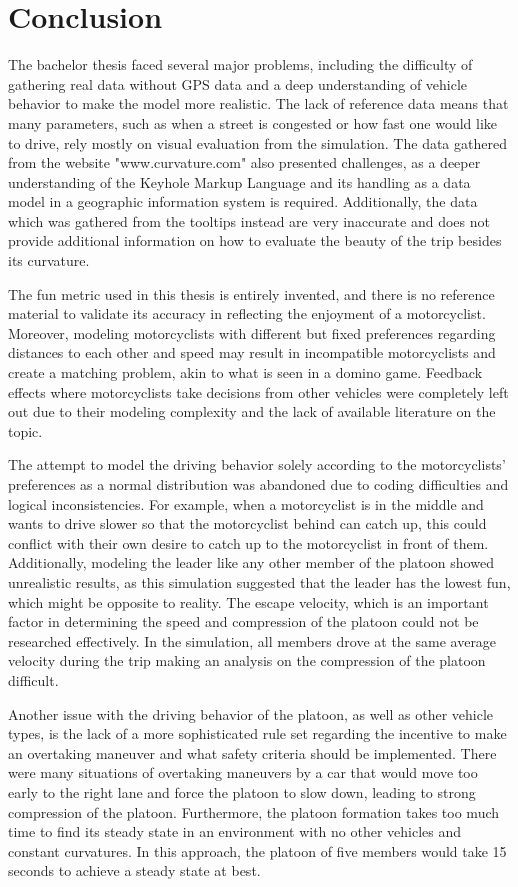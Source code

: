 \chapter{Conclusion}
\label{chaper:Conclusion}
The bachelor thesis faced several major problems, including the difficulty of gathering real data without GPS data and a deep understanding of vehicle behavior to make the model more realistic. The lack of reference data means that many parameters, such as when a street is congested or how fast one would like to drive, rely mostly on visual evaluation from the simulation. The data gathered from the website "www.curvature.com" also presented challenges, as a deeper understanding of the Keyhole Markup Language and its handling as a data model in a geographic information system is required. Additionally, the data which was gathered from the tooltips instead are very inaccurate and does not provide additional information on how to evaluate the beauty of the trip besides its curvature. 

The fun metric used in this thesis is entirely invented, and there is no reference material to validate its accuracy in reflecting the enjoyment of a motorcyclist. Moreover, modeling motorcyclists with different but fixed preferences regarding distances to each other and speed may result in incompatible motorcyclists and create a matching problem, akin to what is seen in a domino game. Feedback effects where motorcyclists take decisions from other vehicles were completely left out due to their modeling complexity and the lack of available literature on the topic.

The attempt to model the driving behavior solely according to the motorcyclists' preferences as a normal distribution was abandoned due to coding difficulties and logical inconsistencies. For example, when a motorcyclist is in the middle and wants to drive slower so that the motorcyclist behind can catch up, this could conflict with their own desire to catch up to the motorcyclist in front of them. Additionally, modeling the leader like any other member of the platoon showed unrealistic results, as this simulation suggested that the leader has the lowest fun, which might be opposite to reality. The escape velocity, which is an important factor in determining the speed and compression of the platoon could not be researched effectively. In the simulation, all members drove at the same average velocity during the trip making an analysis on the compression of the platoon difficult. 

Another issue with the driving behavior of the platoon, as well as other vehicle types, is the lack of a more sophisticated rule set regarding the incentive to make an overtaking maneuver and what safety criteria should be implemented. There were many situations of overtaking maneuvers by a car that would move too early to the right lane and force the platoon to slow down, leading to strong compression of the platoon. Furthermore, the platoon formation takes too much time to find its steady state in an environment with no other vehicles and constant curvatures. In this approach, the platoon of five members would take 15 seconds to achieve a steady state at best.

